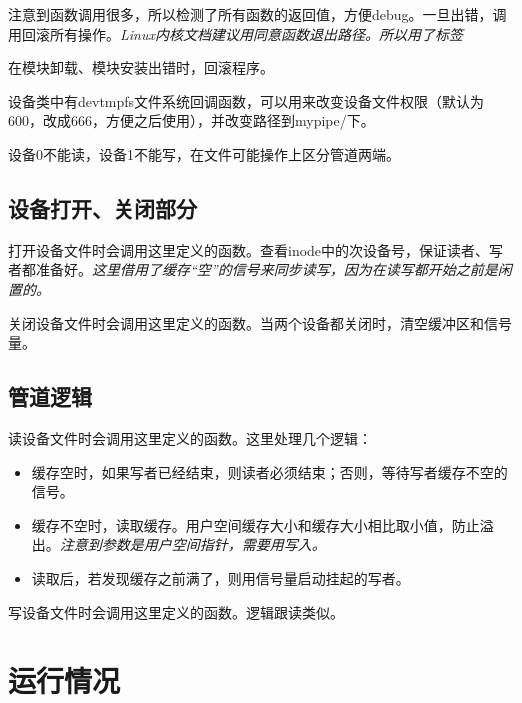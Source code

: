 \documentclass{article}
\begin{document}
注意到函数调用很多，所以检测了所有函数的返回值，方便debug。一旦出错，调用回滚所有操作。\emph{Linux内核文档建议用同意函数退出路径。所以用了标签}

在模块卸载、模块安装出错时，回滚程序。

设备类中有devtmpfs文件系统回调函数，可以用来改变设备文件权限（默认为600，改成666，方便之后使用），并改变路径到mypipe/下。

设备0不能读，设备1不能写，在文件可能操作上区分管道两端。

\subsection{设备打开、关闭部分}
打开设备文件时会调用这里定义的函数。查看inode中的次设备号，保证读者、写者都准备好。\emph{这里借用了缓存“空”的信号来同步读写，因为在读写都开始之前是闲置的。}

关闭设备文件时会调用这里定义的函数。当两个设备都关闭时，清空缓冲区和信号量。

\subsection{管道逻辑}
读设备文件时会调用这里定义的函数。这里处理几个逻辑：
\begin{itemize}
    \item 缓存空时，如果写者已经结束，则读者必须结束；否则，等待写者缓存不空的信号。
    \item 缓存不空时，读取缓存。用户空间缓存大小和缓存大小相比取小值，防止溢出。\emph{注意到参数是用户空间指针，需要用写入。}
    \item 读取后，若发现缓存之前满了，则用信号量启动挂起的写者。
\end{itemize}

写设备文件时会调用这里定义的函数。逻辑跟读类似。

\section{运行情况}
\end{document}
